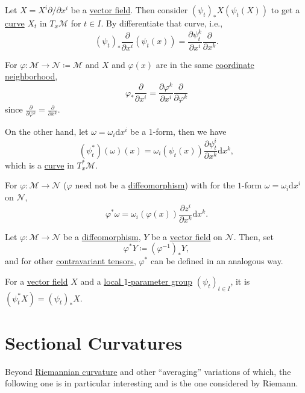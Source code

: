 Let \(X = X^i \partial /\partial x^i\) be a \hyperref[def:vector-field]{vector field}. Then consider \((\psi _t)_{\ast}X(\psi _t (X))\) to get a \hyperref[def:curve]{curve} \(X_t\) in \(T_x \mathcal{M} \) for \(t\in I\). By differentiate that curve, i.e.,
\[
	(\psi _t)_{\ast} \frac{\partial }{\partial x^i} (\psi _t(x))
	= \frac{\partial \psi _t^k}{\partial x^i} \frac{\partial }{\partial x^k}.
\]

\begin{note}
	For \(\varphi \colon \mathcal{M} \to \mathcal{N} \coloneqq \mathcal{M} \) and \(X\) and \(\varphi (x)\) are in the same \hyperref[def:local-coordinate]{coordinate neighborhood},
	\[
		\varphi _{\ast} \frac{\partial }{\partial x^i} = \frac{\partial \varphi ^k}{\partial x^i} \frac{\partial }{\partial \varphi ^k}
	\]
	since \(\frac{\partial }{\partial \varphi ^k} = \frac{\partial }{\partial x^k}\).
\end{note}

On the other hand, let \(\omega = \omega _i \mathrm{d} x^i\) be a \(1\)-form, then we have
\[
	(\psi ^{\ast} _t)(\omega )(x) = \omega _i (\psi _t(x))\frac{\partial \psi _t^i}{\partial x^k} \mathrm{d} x^k,
\]
which is a \hyperref[def:curve]{curve} in \(T_x^{\ast} \mathcal{M} \).

\begin{note}
	For \(\varphi \colon \mathcal{M} \to \mathcal{N} \) (\(\varphi \) need not be a \hyperref[def:diffeomorphism]{diffeomorphism}) with for the \(1\)-form \(\omega = \omega_i \mathrm{d} x^i\) on \(\mathcal{N} \),
	\[
		\varphi ^{\ast} \omega = \omega _i (\varphi (x))\frac{\partial z^i}{\partial x^k} \mathrm{d} x^k.
	\]
\end{note}

Let \(\varphi \colon \mathcal{M} \to \mathcal{N} \) be a \hyperref[def:diffeomorphism]{diffeomorphism}, \(Y\) be a \hyperref[def:vector-field]{vector field} on \(\mathcal{N} \). Then, set
\[
	\varphi ^{\ast} Y\coloneqq (\varphi ^{-1} )_\ast Y,
\]
and for other \hyperref[def:tensor]{contravariant tensors}, \(\varphi ^{\ast} \) can be defined in an analogous way.

\begin{eg}
	For a \hyperref[def:vector-field]{vector field} \(X\) and a \hyperref[def:local-1-parameter-group]{local \(1\)-parameter group} \((\psi _t)_{t\in I}\), it is \((\psi _t ^{\ast} X)= (\psi _t)_\ast X\).
\end{eg}

\section{Sectional Curvatures}
Beyond \hyperref[def:Riemannian-curvature]{Riemannian curvature} and other ``averaging'' variations of which, the following one is in particular interesting and is the one considered by Riemann.

